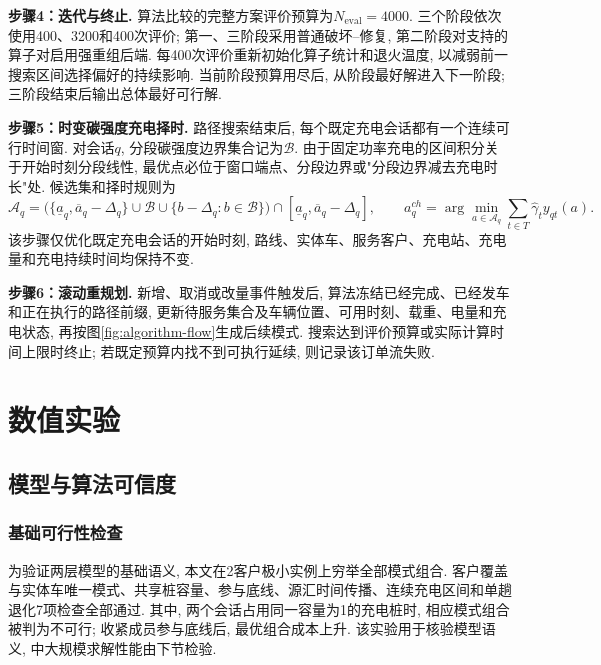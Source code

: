 \documentclass{setp-new}
\begin{document}
\textbf{步骤4：迭代与终止.}
算法比较的完整方案评价预算为$N_{\mathrm{eval}}=4000$.
三个阶段依次使用400、3200和400次评价;
第一、三阶段采用普通破坏--修复,
第二阶段对支持的算子对启用强重组后端.
每400次评价重新初始化算子统计和退火温度,
以减弱前一搜索区间选择偏好的持续影响.
当前阶段预算用尽后, 从阶段最好解进入下一阶段;
三阶段结束后输出总体最好可行解.

\textbf{步骤5：时变碳强度充电择时.}
路径搜索结束后, 每个既定充电会话都有一个连续可行时间窗.
对会话$q$, 分段碳强度边界集合记为$\mathcal B$.
由于固定功率充电的区间积分关于开始时刻分段线性,
最优点必位于窗口端点、分段边界或"分段边界减去充电时长"处.
候选集和择时规则为
\begin{equation}
\mathcal A_q=\bigl(\{\underline a_q,\overline a_q-\Delta_q\}
\cup\mathcal B\cup\{b-\Delta_q:b\in\mathcal B\}\bigr)
\cap[\underline a_q,\overline a_q-\Delta_q],\qquad
a_q^{ch}=\arg\min_{a\in\mathcal A_q}\sum_{t\in T}\widehat\gamma_t y_{qt}(a).
\label{eq:charging-candidates}
\end{equation}
该步骤仅优化既定充电会话的开始时刻,
路线、实体车、服务客户、充电站、充电量和充电持续时间均保持不变.

\textbf{步骤6：滚动重规划.}
新增、取消或改量事件触发后,
算法冻结已经完成、已经发车和正在执行的路径前缀,
更新待服务集合及车辆位置、可用时刻、载重、电量和充电状态,
再按图\ref{fig:algorithm-flow}生成后续模式.
搜索达到评价预算或实际计算时间上限时终止;
若既定预算内找不到可执行延续, 则记录该订单流失败.


\section{数值实验}

\subsection{模型与算法可信度}

\subsubsection{基础可行性检查}

为验证两层模型的基础语义, 本文在2客户极小实例上穷举全部模式组合.
客户覆盖与实体车唯一模式、共享桩容量、参与底线、源汇时间传播、连续充电区间和单趟退化7项检查全部通过.
其中, 两个会话占用同一容量为1的充电桩时, 相应模式组合被判为不可行;
收紧成员参与底线后, 最优组合成本上升.
该实验用于核验模型语义, 中大规模求解性能由下节检验.
\end{document}

